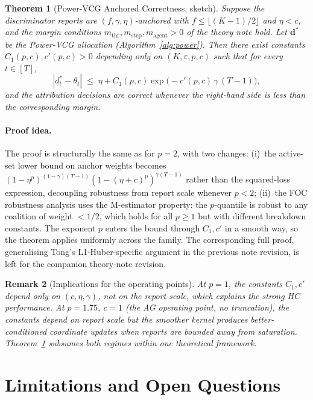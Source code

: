 \documentclass[11pt]{article}
\newtheorem{theorem}{Theorem}
\newtheorem{remark}[theorem]{Remark}
\newcommand{\db}{\bm{d}}
\begin{document}
\begin{theorem}[Power-VCG Anchored Correctness, sketch]
\label{thm:power-anchored}
Suppose the discriminator reports are $(f, \gamma, \eta)$-anchored with
$f \leq \lfloor (K{-}1)/2 \rfloor$ and $\eta < c$, and the margin
conditions $m_{\mathrm{thr}}, m_{\mathrm{step}}, m_{\mathrm{agent}} > 0$
of the theory note hold. Let $\db^*$ be the Power-VCG allocation
(Algorithm~\ref{alg:power}). Then there exist constants $C_1(p, c), c'(p, c) > 0$
depending only on $(K, \varepsilon, p, c)$ such that for every $t \in [T]$,
\[
|d_t^* - \theta_t| \;\leq\; \eta + C_1(p, c) \exp\!\big(-c'(p, c)\,\gamma\,(T-1)\big),
\]
and the attribution decisions are correct whenever the right-hand side
is less than the corresponding margin.
\end{theorem}

\paragraph{Proof idea.}
The proof is structurally the same as for $p = 2$, with two changes:
(i)~the active-set lower bound on anchor weights becomes
$(1 - \eta^p)^{(1-\gamma)(T-1)}(1 - (\eta + c)^p)^{\gamma(T-1)}$ rather
than the squared-loss expression, decoupling robustness from report scale
whenever $p < 2$;
(ii)~the FOC robustness analysis uses the M-estimator property:
the $p$-quantile is robust to any coalition of weight $< 1/2$, which holds
for all $p \geq 1$ but with different breakdown constants. The exponent
$p$ enters the bound through $C_1, c'$ in a smooth way, so the theorem
applies uniformly across the family. The corresponding full proof,
generalising Tong's L1-Huber-specific argument in the previous note
revision, is left for the companion theory-note revision.

\begin{remark}[Implications for the operating points]
At $p = 1$, the constants $C_1, c'$ depend only on $(c, \eta, \gamma)$, not
on the report scale, which explains the strong HC performance.
At $p = 1.75$, $c = 1$ (the AG operating point, no truncation), the
constants depend on report scale but the smoother kernel produces
better-conditioned coordinate updates when reports are bounded away from
saturation. Theorem~\ref{thm:power-anchored} subsumes both regimes within
one theoretical framework.
\end{remark}

\section{Limitations and Open Questions}
\label{sec:limitations}
\end{document}

